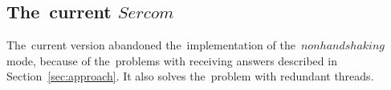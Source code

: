 %
%

\subsection*{The~current $Sercom$}\label{sec:current}
  The~current version abandoned the~implementation of the~$nonhandshaking$ mode, 
  because of the~problems with receiving answers described 
  in Section~\ref{sec:approach}.
  It also solves the~problem with	redundant threads. 

